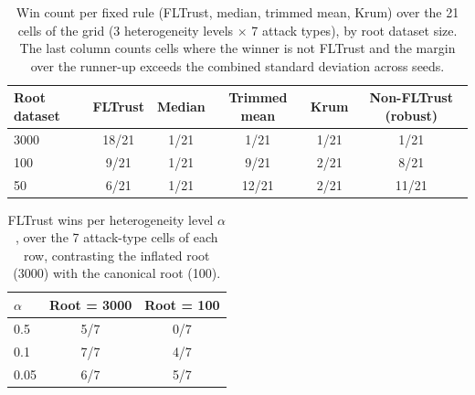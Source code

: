 
\begin{table}[t]
\centering
\caption{Win count per fixed rule (FLTrust, median, trimmed mean, Krum) over the 21 cells of the grid (3 heterogeneity levels $\times$ 7 attack types), by root dataset size. The last column counts cells where the winner is not FLTrust and the margin over the runner-up exceeds the combined standard deviation across seeds.}
\label{tab:root-size-wins}
\begin{tabular}{lccccc}
\toprule
Root dataset & FLTrust & Median & Trimmed mean & Krum & Non-FLTrust (robust) \\
\midrule
3000 & 18/21 & 1/21 & 1/21 & 1/21 & 1/21 \\
100 & 9/21 & 1/21 & 9/21 & 2/21 & 8/21 \\
50 & 6/21 & 1/21 & 12/21 & 2/21 & 11/21 \\
\bottomrule
\end{tabular}
\end{table}

\begin{table}[t]
\centering
\caption{FLTrust wins per heterogeneity level $\alpha$, over the 7 attack-type cells of each row, contrasting the inflated root (3000) with the canonical root (100).}
\label{tab:fltrust-by-alpha}
\begin{tabular}{lcc}
\toprule
$\alpha$ & Root = 3000 & Root = 100 \\
\midrule
0.5 & 5/7 & 0/7 \\
0.1 & 7/7 & 4/7 \\
0.05 & 6/7 & 5/7 \\
\bottomrule
\end{tabular}
\end{table}

